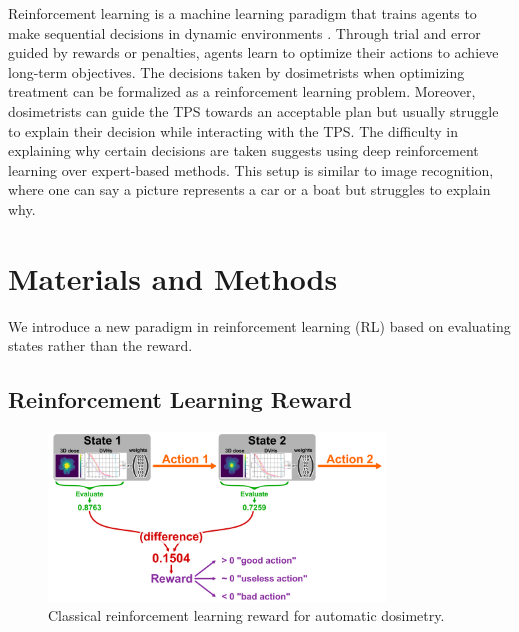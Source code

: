 Reinforcement learning is a machine learning paradigm that trains agents to make sequential decisions in dynamic environments \cite{brooks_what_2021}.
Through trial and error guided by rewards or penalties, agents learn to optimize their actions to achieve long-term objectives.
The decisions taken by dosimetrists when optimizing treatment can be formalized as a reinforcement learning problem.
Moreover, dosimetrists can guide the TPS towards an acceptable plan but usually struggle to explain their decision while interacting with the TPS.
The difficulty in explaining why certain decisions are taken suggests using deep reinforcement learning over expert-based methods.
This setup is similar to image recognition, where one can say a picture represents a car or a boat but struggles to explain why.



\section{Materials and Methods}
We introduce a new paradigm in reinforcement learning (RL) based on evaluating states rather than the reward.

\subsection{Reinforcement Learning Reward}

\begin{figure}
	\centering
	\includegraphics[width=0.8\textwidth]{reward.pdf}
	\caption{Classical reinforcement learning reward for automatic dosimetry.}
	\label{fig:reward_fig}
\end{figure}

